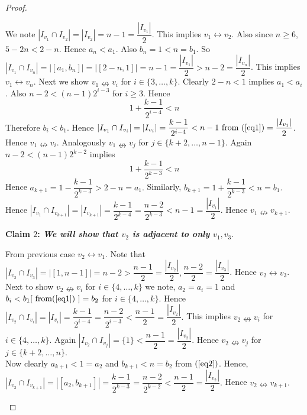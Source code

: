 \documentclass{article}
\theoremstyle{definition}
\numberwithin{equation}{section}
\begin{document}
\begin{proof}
\begin{itemize}
\vspace{.2em}\noindent We note $|I_{v_{1}}\cap I_{v_{2}}|=|I_{v_{2}}|=n-1=\dfrac{|I_{v_{1}}|}{2}$. This implies $v_{1}\leftrightarrow v_{2}$. Also since $n\geq 6$, $5-2n<2-n$. Hence $a_{n}<a_{1}$. Also $b_{n}=1<n=b_{1}$. So $|I_{v_{1}}\cap I_{v_{n}}|=|[a_{1},b_{n}]|=|[2-n,1]|=n-1=\dfrac{|I_{v_{1}}|}{2}>n-2=\dfrac{|I_{v_{n}}|}{2}$. This implies $v_{1}\leftrightarrow v_{n}$. Next we  show $v_{1}\nleftrightarrow v_{i}$ for $i\in\{3,\hdots,k\}$. Clearly $2-n<1$ implies $a_{1}<a_{i}$. Also $n-2<(n-1)2^{i-3} $ for $i\geq 3$. Hence
\begin{equation}\label{eq1}
1+\dfrac{k-1}{2^{i-4}}<n
\end{equation}
Therefore $b_{i}<b_{1}$. Hence $|I_{v_{1}}\cap I_{v_{i}}|=|I_{v_{i}}|=
\dfrac{k-1}{2^{i-4}}<n-1 \text{ from } (\ref{eq1})=\dfrac{|I_{v_{1}}|}{2}$. Hence $v_{1}\nleftrightarrow v_{i}$. Analogously $v_{1}\nleftrightarrow v_{j}$ for $j\in\{k+2,\hdots,n-1\}$.
Again $n-2<(n-1)2^{k-2}$ implies
\begin{equation}\label{eq2}
1+\dfrac{k-1}{2^{k-3}}<n
\end{equation}
Hence $a_{k+1}=1-\dfrac{k-1}{2^{k-3}}>2-n=a_{1}.$
Similarly, $b_{k+1}= 1+\dfrac{k-1}{2^{k-3}}< n=b_{1}.$ Hence
$|I_{v_{1}}\cap I_{v_{k+1}}|=|I_{v_{k+1}}|=
\dfrac{k-1}{2^{k-4}}=\dfrac{n-2}
{2^{k-3}}<n-1=\dfrac{|I_{v_{1}}|}{2}.$ Hence $v_{1}\nleftrightarrow v_{k+1}$.

\vspace{1em}
\noindent \textbf{Claim $2$: \textit{We will show that $v_{2}$ is adjacent to only $v_{1},v_{3}$}}.

 \noindent  From previous case $v_{2}\leftrightarrow v_{1}$. Note that $|I_{v_{2}}\cap I_{v_{3}}|= |[1,n-1]|=n-2>\dfrac{n-1}{2}=\dfrac{|I_{v_{2}}|}{2}, \dfrac{n-2}{2}=\dfrac{|I_{v_{3}}|}{2}$. Hence $v_{2}\leftrightarrow v_{3}$. Next to show $v_{2}\nleftrightarrow v_{i}$ for $i\in\{4,\hdots,k\}$ we note, $a_{2}=a_{i}=1$ and $b_{i}<b_{1}[\text{ from(\ref{eq1}) }]=b_{2}$ for $i\in\{4,\hdots,k\}.$ Hence $|I_{v_{2}}\cap I_{v_{i}}|= |I_{v_{i}}|=\dfrac{k-1}{2^{i-4}}=\dfrac{n-2}{2^{i-3}}<\dfrac{n-1}{2}=\dfrac{|I_{v_{2}}|}{2}.$ This implies $v_{2}\nleftrightarrow v_{i}$ for $i\in\{4,\hdots,k\}.$ Again $|I_{v_{2}}\cap I_{v_{j}}|=\{1\}<\dfrac{n-1}{2}=\dfrac{|I_{v_{2}}|}{2}$. Hence $v_{2}\nleftrightarrow v_{j}$ for $j\in\{k+2,\hdots,n\}.$\\
Now clearly $a_{k+1}<1= a_{2}$ and $b_{k+1}<n=b_{2}$ from $( \ref{eq2} )$. Hence, $|I_{v_{2}}\cap I_{v_{k+1}}|= |[a_{2},b_{k+1}]|= \dfrac{k-1}{2^{k-3}}=\dfrac{n-2}{2^{k-2}}< \dfrac{n-1}{2}=\dfrac{|I_{v_{2}}|}{2}.$
Hence $v_{2}\nleftrightarrow v_{k+1}.$


\end{itemize}
\end{proof}
\end{document}

